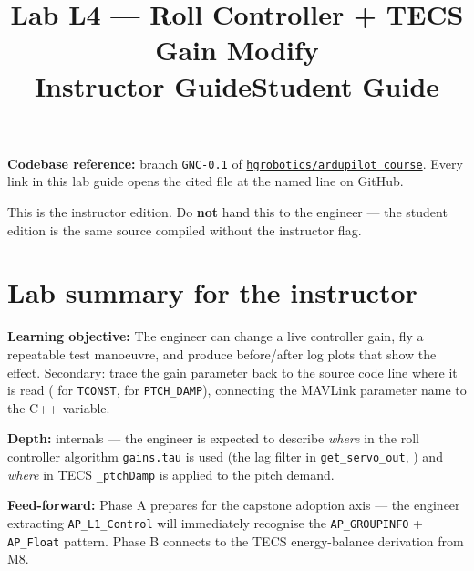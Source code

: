 \documentclass[a4paper,11pt,twoside]{article}
\title{Lab L4 --- Roll Controller + TECS Gain Modify\\
  \large \ifinstructor Instructor Guide\else Student Guide\fi}
\author{\copyrightline}
\date{}
\begin{document}
\maketitle

\noindent\textbf{Codebase reference:} branch \texttt{GNC-0.1} of \href{\repourl}{\nolinkurl{hgrobotics/ardupilot_course}}. Every link in this lab guide opens the cited file at the named line on GitHub.

\bigskip

\ifinstructor

\begin{tcolorbox}[colback=red!5!white,colframe=red!40!black,title=Instructor edition]
This is the instructor edition. Do \textbf{not} hand this to the engineer --- the student edition is the same source compiled without the instructor flag.
\end{tcolorbox}

\section*{Lab summary for the instructor}

\textbf{Learning objective:} The engineer can change a live controller gain, fly a repeatable test manoeuvre, and produce before/after log plots that show the effect. Secondary: trace the gain parameter back to the source code line where it is read ( for \texttt{TCONST},  for \texttt{PTCH\_DAMP}), connecting the MAVLink parameter name to the C++ variable.

\textbf{Depth:} internals --- the engineer is expected to describe \emph{where} in the roll controller algorithm \texttt{gains.tau} is used (the lag filter in \texttt{get\_servo\_out}, ) and \emph{where} in TECS \texttt{\_ptchDamp} is applied to the pitch demand.

\textbf{Feed-forward:} Phase A prepares for the capstone adoption axis --- the engineer extracting \texttt{AP\_L1\_Control} will immediately recognise the \texttt{AP\_GROUPINFO} + \texttt{AP\_Float} pattern. Phase B connects to the TECS energy-balance derivation from M8.
\end{document}
